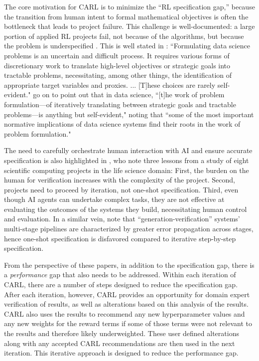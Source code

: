 \documentclass[mnsc,sglanonrev]{informs4}
\begin{document}
The core motivation for CARL is to minimize the ``RL specification gap,'' because the transition from human intent to formal mathematical objectives is often the bottleneck that leads to project failure. This challenge is well-documented: a large portion of applied RL projects fail, not because of the algorithms, but because the problem is underspecified \citep{hamadanian_how_2022}. 
This is well stated in \cite{passi_problem_2019}: ``Formulating data science problems is an uncertain and difficult process. It requires various forms of discretionary work to translate high-level objectives or strategic goals into tractable problems, necessitating, among other things, the identification of appropriate target variables and proxies. ... [T]hese choices are rarely self-evident." \cite{passi_problem_2019} go on to point out that in data science, ``[t]he work of problem formulation---of iteratively
translating between strategic goals and tractable problems---is
anything but self-evident," noting that ``some of the most
important normative implications of data science systems find their roots in the work of problem formulation."

The need to carefully orchestrate human interaction with AI and ensure accurate specification is also highlighted in \cite{li_scientific_2024}, who note three lessons from a study of eight scientific computing projects in the life science domain: First, the burden on the human for verification increases with the complexity of the project. Second, projects need to proceed by iteration, not one-shot specification. Third, even though AI agents can undertake complex tasks, they are not effective at evaluating the outcomes of the systems they build, necessitating human control and evaluation. In a similar vein, \cite{meng_scientistone_2026} note that ``generation-verification'' systems' multi-stage pipelines are characterized by greater error propagation across stages, hence one-shot specification is disfavored compared to iterative step-by-step specification. 

From the perspective of these papers, in addition to the specification gap, there is a \emph{performance} gap that also needs to be addressed. Within each iteration of CARL, there are a number of steps designed to reduce the specification gap. After each iteration, however, CARL provides an opportunity for domain expert verification of results, as well as alterations based on this analysis of the results. CARL also uses the results to recommend any new hyperparameter values and any new weights for the reward terms if some of those terms were not relevant to the results and therefore likely underweighted. These user defined alterations along with any accepted CARL recommendations are then used in the next iteration. This iterative approach is designed to reduce the performance gap.
\end{document}
